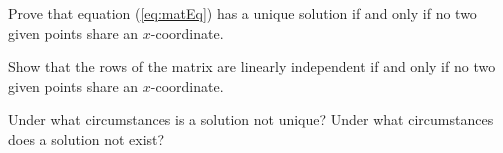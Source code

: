 \documentclass{ximera}
\begin{document}
\begin{problem}\label{prob:systemProblems2}
Prove that equation (\ref{eq:matEq}) has a unique solution if and only if no two given points share an $x$-coordinate.
\begin{hint}
    Show that the rows of the matrix are linearly independent if and only if no two given points share an $x$-coordinate.
\end{hint}
Under what circumstances is a solution not unique?  Under what circumstances does a solution not exist?
\end{problem}
\end{document}
